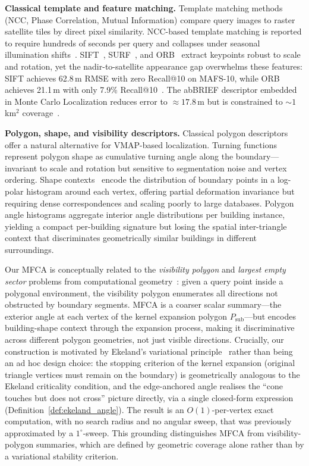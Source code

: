 \documentclass[10pt]{article}
\theoremstyle{plain}
\theoremstyle{definition}
\begin{document}
\noindent\textbf{Classical template and feature matching.}
Template matching methods (NCC, Phase Correlation, Mutual Information) compare
query images to raster satellite tiles by direct pixel similarity.
NCC-based template matching is reported to require hundreds of seconds per
query and collapses under seasonal illumination shifts~\cite{ouyang2024cfbvm}.
SIFT~\cite{lowe2004sift}, SURF~\cite{bay2006surf}, and
ORB~\cite{rublee2011orb} extract keypoints robust to scale and rotation, yet
the nadir-to-satellite appearance gap overwhelms these features: SIFT achieves
62.8\,m RMSE with zero Recall@10 on MAFS-10, while ORB achieves 21.1\,m with
only 7.9\% Recall@10~\cite{yuan2025swapf}.
The abBRIEF descriptor embedded in Monte Carlo Localization reduces error to
${\approx}17.8$\,m but is constrained to ${\sim}1$\,km$^2$
coverage~\cite{mantelli2019abbrief}.


\noindent\textbf{Polygon, shape, and visibility descriptors.}
Classical polygon descriptors offer a natural alternative for VMAP-based
localization.
Turning functions~\cite{arkin1991efsd} represent polygon shape as cumulative
turning angle along the boundary---invariant to scale and rotation but
sensitive to segmentation noise and vertex ordering.
Shape contexts~\cite{belongie2002shape} encode the distribution of boundary
points in a log-polar histogram around each vertex, offering partial
deformation invariance but requiring dense correspondences and scaling poorly
to large databases.
Polygon angle histograms aggregate interior angle distributions per building
instance, yielding a compact per-building signature but losing the spatial
inter-triangle context that discriminates geometrically similar buildings in
different surroundings.

Our MFCA is conceptually related to the \emph{visibility polygon}
and \emph{largest empty sector} problems from computational
geometry~\cite{devadoss2011discrete,orourke1987computational}: given a
query point inside a polygonal environment, the visibility polygon enumerates
all directions not obstructed by boundary segments.
MFCA is a coarser scalar summary---the exterior angle at each vertex of the
kernel expansion polygon $P_{\mathrm{sub}}$---but encodes building-shape
context through the expansion process, making it discriminative across
different polygon geometries, not just visible directions.
Crucially, our construction is motivated by Ekeland's variational
principle~\cite{ekeland1974} rather than being an ad hoc design choice:
the stopping criterion of the kernel expansion (original triangle vertices
must remain on the boundary) is geometrically analogous to the Ekeland
criticality condition, and the edge-anchored angle realises the ``cone
touches but does not cross'' picture directly, via a single closed-form
expression (Definition~\ref{def:ekeland_angle}).
The result is an $O(1)$-per-vertex exact computation, with no search radius
and no angular sweep, that was previously approximated by a
$1^\circ$-sweep.
This grounding distinguishes MFCA from visibility-polygon summaries, which
are defined by geometric coverage alone rather than by a variational
stability criterion.
\end{document}
